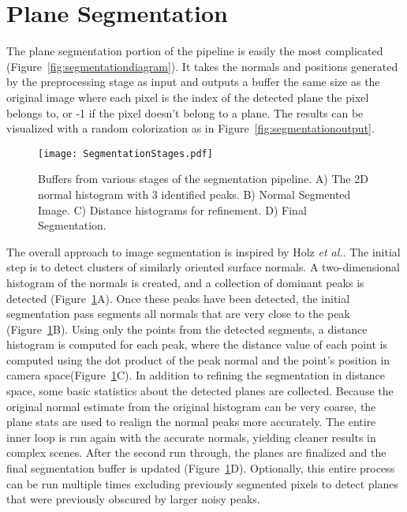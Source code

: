 \section{Plane Segmentation}
The plane segmentation portion of the pipeline is easily the most complicated (Figure~\ref{fig:segmentationdiagram}). It takes the normals and positions generated by the preprocessing stage as input and outputs a buffer the same size as the original image where each pixel is the index of the detected plane the pixel belongs to, or -1 if the pixel doesn't belong to a plane. The results can be visualized with a random colorization as in Figure~\ref{fig:segmentationoutput}.
\begin{figure}[!htbp]
    \centering
    \texttt{[image: SegmentationStages.pdf]}
    \caption{Buffers from various stages of the segmentation pipeline. A) The 2D normal histogram with 3 identified peaks. B) Normal Segmented Image. C) Distance histograms for refinement. D) Final Segmentation.}
    \label{fig:segmentationstages}
\end{figure}

The overall approach to image segmentation is inspired by Holz \textit{et al.}\cite{holz2012real}. The initial step is to detect clusters of similarly oriented surface normals. A two-dimensional histogram of the normals is created, and a collection of dominant peaks is detected (Figure~\ref{fig:segmentationstages}A). Once these peaks have been detected, the initial segmentation pass segments all normals that are very close to the peak (Figure~\ref{fig:segmentationstages}B). Using only the points from the detected segments, a distance histogram is computed for each peak, where the distance value of each point is computed using the dot product of the peak normal and the point's position in camera space(Figure~\ref{fig:segmentationstages}C). In addition to refining the segmentation in distance space, some basic statistics about the detected planes are collected. Because the original normal estimate from the original histogram can be very coarse, the plane stats are used to realign the normal peaks more accurately. The entire inner loop is run again with the accurate normals, yielding cleaner results in complex scenes. After the second run through, the planes are finalized and the final segmentation buffer is updated (Figure~\ref{fig:segmentationstages}D). Optionally, this entire process can be run multiple times excluding previously segmented pixels to detect planes that were previously obscured by larger noisy peaks.

